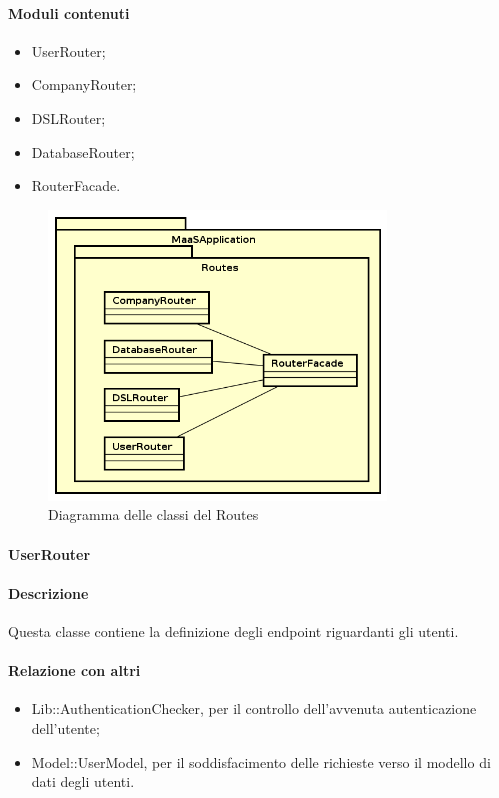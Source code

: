 \paragraph*{Moduli contenuti}
\begin{itemize}
\item UserRouter;
\item CompanyRouter;
\item DSLRouter;
\item DatabaseRouter;
\item RouterFacade.
\end{itemize}

\begin{figure}[H]
\centering
\includegraphics[width=0.8\textwidth]{res/sections/backend/routes.png}
\caption{Diagramma delle classi del  Routes}
\end{figure}

\paragraph{UserRouter}
\paragraph*{Descrizione}
Questa classe contiene la definizione degli endpoint riguardanti gli utenti. 

\paragraph*{Relazione con altri }
\begin{itemize}
\item Lib::AuthenticationChecker, per il controllo dell'avvenuta autenticazione dell'utente;
\item Model::UserModel, per il soddisfacimento delle richieste verso il modello di dati degli utenti.
\end{itemize}

